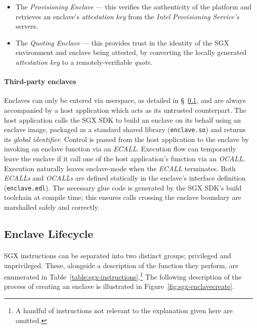 \begin{itemize}
    \item The \textit{Provisioning Enclave} --- this verifies the authenticity of the platform and retrieves an enclave's \textit{attestation key} from the \textit{Intel Provisioning Service's} servers.
    \item The \textit{Quoting Enclave} --- this provides trust in the identity of the SGX environment and enclave being attested, by converting the locally generated \textit{attestation key} to a remotely-verifiable \textit{quote}.
\end{itemize}

\paragraph{Third-party enclaves} Enclaves can only be entered via userspace, as detailed in §~\ref{sec:sgx-lifecycle}, and are always accompanied by a host application which acts as its untrusted counterpart. The host application calls the SGX SDK to build an enclave on its behalf using an enclave image, packaged as a standard shared library (\texttt{enclave.so}) and returns its \textit{global identifier}. Control is passed from the host application to the enclave by invoking an enclave function via an \textit{ECALL}. Execution flow can temporarily leave the enclave if it call one of the host application's function via an \textit{OCALL}. Execution naturally leaves enclave-mode when the \textit{ECALL} terminates. Both \textit{ECALLs} and \textit{OCALLs} are defined statically in the enclave's interface definition (\texttt{enclave.edl}). The necessary glue code is generated by the SGX SDK's build toolchain at compile time; this ensures calls crossing the enclave boundary are marshalled safely and correctly.


\subsection{Enclave Lifecycle}
\label{sec:sgx-lifecycle}

\paragraph{} SGX instructions can be separated into two distinct groups; privileged and unprivileged. These, alongside a description of the function they perform, are enumerated in Table~\ref{table:sgx-instructions}.\footnote{A handful of instructions not relevant to the explanation given here are omitted.} The following description of the process of creating an enclave is illustrated in Figure~\ref{fig:sgx-enclavecreate}.

